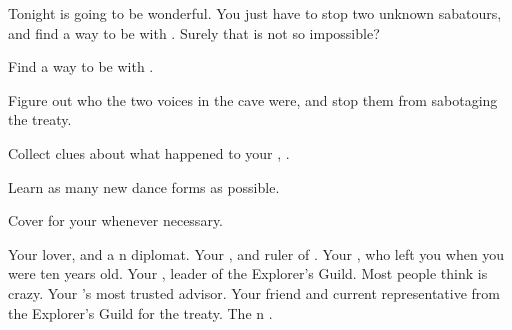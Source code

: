 \documentclass[char]{NeptuneBall}
\begin{document}
Tonight is going to be wonderful. You just have to stop two unknown sabatours, and find a way to be with \cDiplomat{}. Surely that is not so impossible?

\begin{itemz}[Goals]
  \item Find a way to be with \cDiplomat{}.
  \item Figure out who the two voices in the cave were, and stop them from sabotaging the treaty.
  \item Collect clues about what happened to your \cQueen{\parent}, \cQueen{\King} \cQueen{}.
  \item Learn as many new dance forms as possible.
  \item Cover for your \cKing{\parent} whenever necessary.
\end{itemz}

\begin{contacts}
  \contact{\cDiplomat{}} Your lover, and a \pPacifica{}n diplomat.
  \contact{\cKing{}} Your \cKing{\parent}, and ruler of \pAtlantis{}.
  \contact{\cAriel{}} Your \cAriel{\sibling}, who left you when you were ten years old.
  \contact{\cPlant{}} Your \cPlant{\uncle}, leader of the Explorer's Guild. Most people think  is crazy.
  \contact{\cManta{}} Your \cKing{\parent}'s most trusted advisor.
  \contact{\cPriest{}} Your friend and current representative from the Explorer's Guild for the treaty.
  \contact{\cPrince{}} The \pPacifica{}n \cPrince{\prince}.
\end{contacts}
\end{document}
